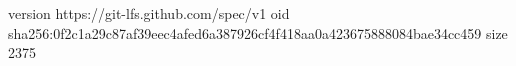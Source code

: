 version https://git-lfs.github.com/spec/v1
oid sha256:0f2c1a29c87af39eec4afed6a387926cf4f418aa0a423675888084bae34cc459
size 2375
